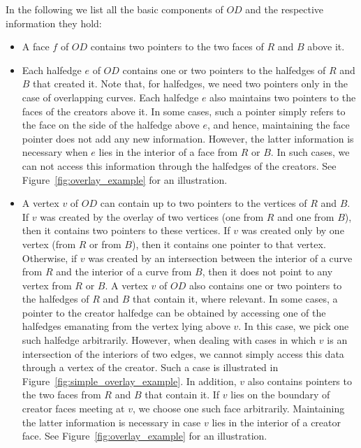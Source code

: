In the following we list all the basic components of $OD$ and 
the respective information they hold:
\begin{itemize}
\item A face $f$ of $OD$ contains two pointers 
to the two faces of $R$ and $B$ above it.
\item Each halfedge $e$ of $OD$ contains one or two pointers 
to the halfedges of $R$ and $B$ that created it. 
Note that, for halfedges, we need two pointers only 
in the case of overlapping curves. 
Each halfedge $e$ also maintains two pointers to the faces of the 
creators above it. 
In some cases, such a pointer simply refers to the face on the 
side of the halfedge above $e$, and hence, maintaining the face 
pointer does not add any new information. 
However, the latter information is necessary when $e$ lies in 
the interior of a face from $R$ or $B$.
In such cases, we can not access this information through the 
halfedges of the creators. 
See Figure~\ref{fig:overlay_example} for an illustration.
\item A vertex $v$ of $OD$ can contain up to two pointers to the 
vertices of $R$ and $B$. If $v$ was created by the overlay of 
two vertices (one from $R$ and one from $B$), then it contains 
two pointers to these vertices.
If $v$ was created only by one vertex (from $R$ or from $B$), then 
it contains one pointer to that vertex. Otherwise, if $v$ was 
created by an intersection between the interior of a curve from 
$R$ and the interior of a curve from $B$, then it does not point 
to any vertex from $R$ or $B$. 
A vertex $v$ of $OD$ also contains one or two pointers 
to the halfedges of $R$ and $B$ that contain it, where relevant. 
In some cases, a pointer to the creator halfedge can be obtained by 
accessing one of the halfedges emanating from the vertex lying above 
$v$. In this case, we pick one such halfedge arbitrarily.
However, when dealing with cases in which $v$ is an intersection 
of the interiors of two edges, 
we cannot simply access this data through a vertex of the creator.
Such a case is illustrated in Figure~\ref{fig:simple_overlay_example}.
In addition, $v$ also contains pointers to the two 
faces from $R$ and $B$ that contain it. 
If $v$ lies on the boundary of creator faces meeting at $v$,
we choose one such face arbitrarily.
Maintaining the latter information is necessary 
in case $v$ lies in the interior of a creator face.
See Figure~\ref{fig:overlay_example} for an illustration.
\end{itemize}


